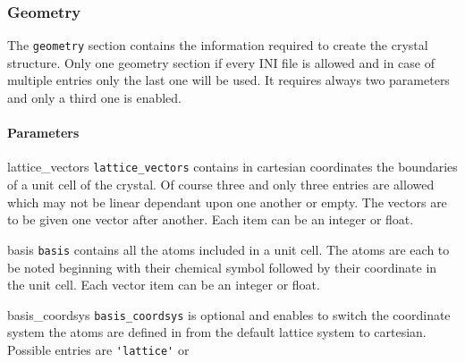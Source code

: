 \subsubsection{Geometry}
The \lstinline{geometry} section contains the information required to create the crystal structure. Only one geometry section if every INI file is allowed and in case of multiple entries only the last one will be used. It requires always two parameters and only a third one is enabled.
\paragraph{Parameters}
\begin{description}
 \item{lattice_vectors} \lstinline{lattice_vectors} contains in cartesian coordinates the boundaries of a unit cell of the crystal. Of course three and only three entries are allowed which may not be linear dependant upon one another or empty. The vectors are to be given one vector after another. Each item can be an integer or float.
 \item{basis} \lstinline{basis} contains all the atoms included in a unit cell. The atoms are each to be noted beginning with their chemical symbol followed by their coordinate in the unit cell. Each vector item can be an integer or float.
 \item{basis_coordsys} \lstinline{basis_coordsys} is optional and enables to switch the coordinate system the atoms are defined in from the default lattice system to cartesian. Possible entries are \lstinline{'lattice'} or  
\end{description}
